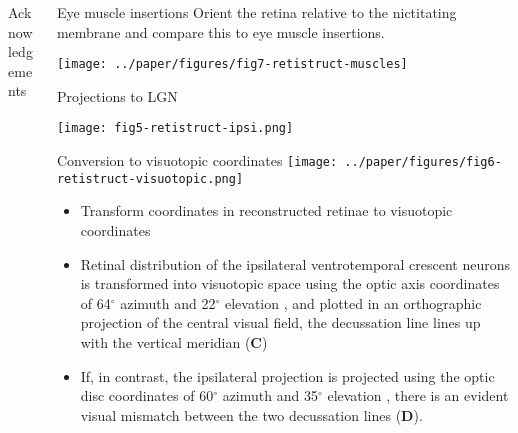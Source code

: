 \documentclass[final]{beamer}
\begin{document}
\begin{frame}{}
\begin{columns}[T]
\begin{column}{.25\linewidth}
\begin{block}{\large Acknowledgements}
      \end{block}




    \end{column}



    \begin{column}{.37\linewidth}

      \begin{block}{Eye muscle insertions}
        Orient the retina relative to the nictitating membrane and
        compare this to eye muscle insertions.

                \texttt{[image: ../paper/figures/fig7-retistruct-muscles]}     
      \end{block}

      \begin{block}{Projections to LGN}

        \texttt{[image: fig5-retistruct-ipsi.png]}     
      \end{block}

      \begin{block}{Conversion to visuotopic coordinates}
        \texttt{[image: ../paper/figures/fig6-retistruct-visuotopic.png]}     
        
        \begin{itemize}
        \item Transform coordinates in reconstructed retinae to
          visuotopic coordinates
      \item Retinal distribution of the ipsilateral ventrotemporal
        crescent neurons is transformed into visuotopic space using
        the optic axis coordinates of 64$^{\circ}$ azimuth and
        22$^{\circ}$ elevation \citep{OommenStahl2008}, and plotted in
        an orthographic projection of the central visual field, the
        decussation line lines up with the vertical meridian
        (\textbf{C})
      \item If, in contrast, the ipsilateral projection is projected
        using the optic disc coordinates of 60$^{\circ}$ azimuth and
        35$^{\circ}$ elevation \citep{Drager1978}, there is an evident
        visual mismatch between the two decussation lines
        (\textbf{D}).
        \end{itemize}

      \end{block}



\end{column}
\end{columns}
\end{frame}
\end{document}
